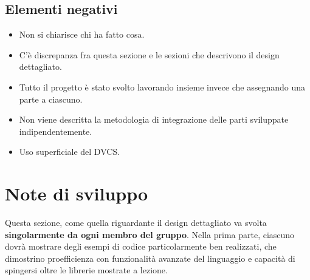 \documentclass[a4paper,12pt]{report}
\begin{document}
\subsection*{Elementi negativi}
\begin{itemize}
	\item Non si chiarisce chi ha fatto cosa.
	\item C'è discrepanza fra questa sezione e le sezioni che descrivono il design dettagliato.
	\item Tutto il progetto è stato svolto lavorando insieme invece che assegnando una parte a ciascuno.
	\item Non viene descritta la metodologia di integrazione delle parti sviluppate indipendentemente.
	\item Uso superficiale del DVCS.
\end{itemize}

\section{Note di sviluppo}

Questa sezione, come quella riguardante il design dettagliato va svolta \textbf{singolarmente da ogni membro del gruppo}.
%
Nella prima parte, ciascuno dovrà mostrare degli esempi di codice particolarmente ben realizzati,
che dimostrino proefficienza con funzionalità avanzate del linguaggio e capacità di spingersi oltre le librerie mostrate a lezione.
\end{document}
